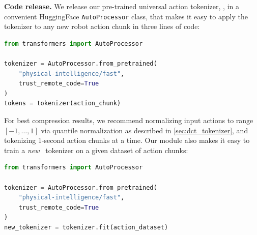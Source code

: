 \noindent\textbf{Code release.} We release our pre-trained universal action tokenizer, \ModelUniversalAcronym, in a convenient HuggingFace \texttt{AutoProcessor} class, that makes it easy to apply the tokenizer to any new robot action chunk in three lines of code:



\begin{lstlisting}[language=Python]
from transformers import AutoProcessor

tokenizer = AutoProcessor.from_pretrained(
    "physical-intelligence/fast", 
    trust_remote_code=True
)
tokens = tokenizer(action_chunk)
\end{lstlisting}

For best compression results, we recommend normalizing input actions to range $[-1, \dots, 1]$ via quantile normalization as described in \cref{sec:dct_tokenizer}, and tokenizing 1-second action chunks at a time. 
Our module also makes it easy to train a \emph{new} \ModelAcronym~tokenizer on a given dataset of action chunks:
\begin{lstlisting}[language=Python]
from transformers import AutoProcessor

tokenizer = AutoProcessor.from_pretrained(
    "physical-intelligence/fast", 
    trust_remote_code=True
)
new_tokenizer = tokenizer.fit(action_dataset)
\end{lstlisting}





